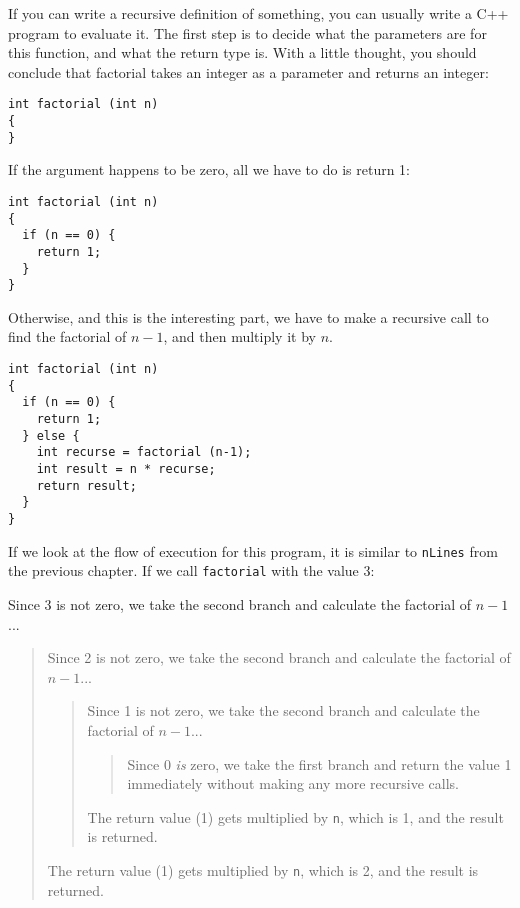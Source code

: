 If you can write a recursive definition of something, you can usually
write a C++ program to evaluate it.  The first step is to decide what
the parameters are for this function, and what the return type is.
With a little thought, you should conclude that factorial takes an
integer as a parameter and returns an integer:

\begin{verbatim}
int factorial (int n)
{
}
\end{verbatim}
%
If the argument happens to be zero, all we have to do is
return 1:

\begin{verbatim}
int factorial (int n)
{
  if (n == 0) {
    return 1;
  }
}
\end{verbatim}
%
Otherwise, and this is the interesting part, we have to make
a recursive call to find the factorial of $n-1$, and then
multiply it by $n$.

\begin{verbatim}
int factorial (int n)
{
  if (n == 0) {
    return 1;
  } else {
    int recurse = factorial (n-1);
    int result = n * recurse;
    return result;
  }
}
\end{verbatim}
%
If we look at the flow of execution for this program,
it is similar to {\tt nLines} from the previous chapter.
If we call {\tt factorial} with the value 3:

Since 3 is not zero, we take the second branch and calculate
the factorial of $n-1$...

\begin{quote}
Since 2 is not zero, we take the second branch and calculate
the factorial of $n-1$...

\begin{quote}
Since 1 is not zero, we take the second branch and calculate
the factorial of $n-1$...

\begin{quote}
Since 0 {\em is} zero, we take the first branch and return
the value 1 immediately without making any more recursive
calls.

\end{quote}

The return value (1) gets multiplied by {\tt n}, which is 1,
and the result is returned.

\end{quote}

The return value (1) gets multiplied by {\tt n}, which is 2,
and the result is returned.

\end{quote}

